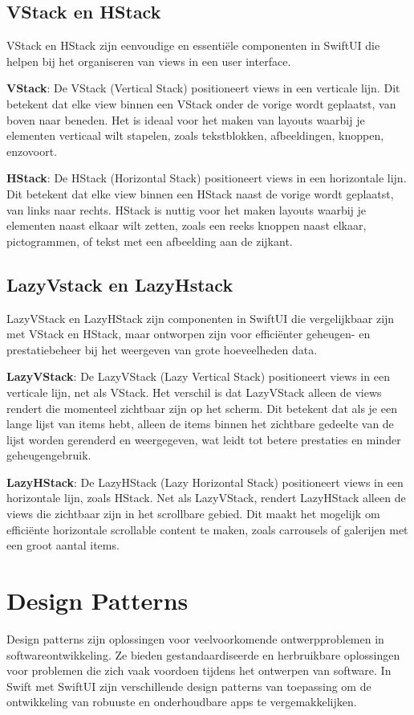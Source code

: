 \subsection{VStack en HStack}
\autocite{AppleVstackHstack} VStack en HStack zijn eenvoudige en essentiële componenten in SwiftUI die helpen bij het organiseren van views in een user interface.

\textbf{VStack}: De VStack (Vertical Stack) positioneert views in een verticale lijn. Dit betekent dat elke view binnen een VStack onder de vorige wordt geplaatst, van boven naar beneden. Het is ideaal voor het maken van layouts waarbij je elementen verticaal wilt stapelen, zoals tekstblokken, afbeeldingen, knoppen, enzovoort.

\textbf{HStack}: De HStack (Horizontal Stack) positioneert views in een horizontale lijn. Dit betekent dat elke view binnen een HStack naast de vorige wordt geplaatst, van links naar rechts. HStack is nuttig voor het maken layouts waarbij je elementen naast elkaar wilt zetten, zoals een reeks knoppen naast elkaar, pictogrammen, of tekst met een afbeelding aan de zijkant.

\subsection{LazyVstack en LazyHstack}
\autocite{LazyHStackVStack} LazyVStack en LazyHStack zijn componenten in SwiftUI die vergelijkbaar zijn met VStack en HStack, maar ontworpen zijn voor efficiënter geheugen- en prestatiebeheer bij het weergeven van grote hoeveelheden data. 

\textbf{LazyVStack}: De LazyVStack (Lazy Vertical Stack) positioneert views in een verticale lijn, net als VStack. Het verschil is dat LazyVStack alleen de views rendert die momenteel zichtbaar zijn op het scherm. Dit betekent dat als je een lange lijst van items hebt, alleen de items binnen het zichtbare gedeelte van de lijst worden gerenderd en weergegeven, wat leidt tot betere prestaties en minder geheugengebruik.

\textbf{LazyHStack}: De LazyHStack (Lazy Horizontal Stack) positioneert views in een horizontale lijn, zoals HStack. Net als LazyVStack, rendert LazyHStack alleen de views die zichtbaar zijn in het scrollbare gebied. Dit maakt het mogelijk om efficiënte horizontale scrollable content te maken, zoals carrousels of galerijen met een groot aantal items.

\section{Design Patterns}
Design patterns zijn oplossingen voor veelvoorkomende ontwerpproblemen in softwareontwikkeling. Ze bieden gestandaardiseerde en herbruikbare oplossingen voor problemen die zich vaak voordoen tijdens het ontwerpen van software. In Swift met SwiftUI zijn verschillende design patterns van toepassing om de ontwikkeling van robuuste en onderhoudbare apps te vergemakkelijken.

